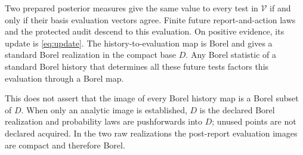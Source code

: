 \begin{proposition}\label{prop:quotient}
Two prepared posterior measures give the same value to every test in $\mathcal V$ if and only if their basis evaluation vectors agree. Finite future report-and-action laws and the protected audit descend to this evaluation. On positive evidence, its update is \eqref{eq:update}. The history-to-evaluation map is Borel and gives a standard Borel realization in the compact base $D$. Any Borel statistic of a standard Borel history that determines all these future tests factors this evaluation through a Borel map.

This does not assert that the image of every Borel history map is a Borel subset of $D$. When only an analytic image is established, $D$ is the declared Borel realization and probability laws are pushforwards into $D$; unused points are not declared acquired. In the two raw realizations the post-report evaluation images are compact and therefore Borel.
\end{proposition}
